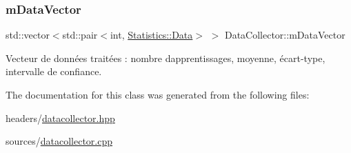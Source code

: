 \mbox{\label{classDataCollector_a8d1d5a743e394b578545fa2d7b0ce4ee}} 
\subsubsection{\texorpdfstring{m\+Data\+Vector}{mDataVector}}
{\footnotesize\ttfamily std\+::vector$<$std\+::pair$<$int, \hyperlink{structStatistics_1_1Data}{Statistics\+::\+Data}$>$ $>$ Data\+Collector\+::m\+Data\+Vector\hspace{0.3cm}{\ttfamily [private]}}



Vecteur de données traitées \+: nombre d\textquotesingle{}apprentissages, moyenne, écart-\/type, intervalle de confiance. 



The documentation for this class was generated from the following files\+:\begin{DoxyCompactItemize}
\item 
headers/\hyperlink{datacollector_8hpp}{datacollector.\+hpp}\item 
sources/\hyperlink{datacollector_8cpp}{datacollector.\+cpp}\end{DoxyCompactItemize}
